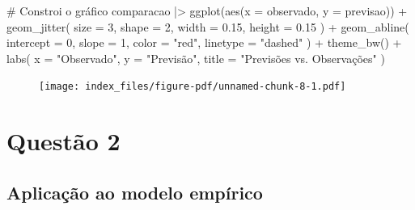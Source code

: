 \documentclass[
  letterpaper,
  DIV=11,
  numbers=noendperiod]{scrreprt}
\newenvironment{Shaded}{\begin{snugshade}}{\end{snugshade}}
\newcommand{\AttributeTok}[1]{\textcolor[rgb]{0.40,0.45,0.13}{#1}}
\newcommand{\CommentTok}[1]{\textcolor[rgb]{0.37,0.37,0.37}{#1}}
\newcommand{\DecValTok}[1]{\textcolor[rgb]{0.68,0.00,0.00}{#1}}
\newcommand{\FloatTok}[1]{\textcolor[rgb]{0.68,0.00,0.00}{#1}}
\newcommand{\FunctionTok}[1]{\textcolor[rgb]{0.28,0.35,0.67}{#1}}
\newcommand{\NormalTok}[1]{\textcolor[rgb]{0.00,0.23,0.31}{#1}}
\newcommand{\SpecialCharTok}[1]{\textcolor[rgb]{0.37,0.37,0.37}{#1}}
\newcommand{\StringTok}[1]{\textcolor[rgb]{0.13,0.47,0.30}{#1}}
\begin{document}
\begin{Shaded}
\begin{Highlighting}[]
\CommentTok{\# Constroi o gráfico}
\NormalTok{comparacao }\SpecialCharTok{|\textgreater{}}
    \FunctionTok{ggplot}\NormalTok{(}\FunctionTok{aes}\NormalTok{(}\AttributeTok{x =}\NormalTok{ observado, }\AttributeTok{y =}\NormalTok{ previsao)) }\SpecialCharTok{+}
    \FunctionTok{geom\_jitter}\NormalTok{(}
        \AttributeTok{size =} \DecValTok{3}\NormalTok{, }\AttributeTok{shape =} \DecValTok{2}\NormalTok{,}
        \AttributeTok{width =} \FloatTok{0.15}\NormalTok{, }\AttributeTok{height =} \FloatTok{0.15}
\NormalTok{    ) }\SpecialCharTok{+}
    \FunctionTok{geom\_abline}\NormalTok{(}
        \AttributeTok{intercept =} \DecValTok{0}\NormalTok{,}
        \AttributeTok{slope =} \DecValTok{1}\NormalTok{,}
        \AttributeTok{color =} \StringTok{"red"}\NormalTok{,}
        \AttributeTok{linetype =} \StringTok{"dashed"}
\NormalTok{    ) }\SpecialCharTok{+}
    \FunctionTok{theme\_bw}\NormalTok{() }\SpecialCharTok{+}
    \FunctionTok{labs}\NormalTok{(}
        \AttributeTok{x =} \StringTok{"Observado"}\NormalTok{,}
        \AttributeTok{y =} \StringTok{"Previsão"}\NormalTok{,}
        \AttributeTok{title =} \StringTok{"Previsões vs. Observações"}
\NormalTok{    )}
\end{Highlighting}
\end{Shaded}

\begin{figure}[H]

{\centering \texttt{[image: index\_files/figure-pdf/unnamed-chunk-8-1.pdf]}

}

\end{figure}


\hypertarget{questuxe3o-2}{%
\chapter*{Questão 2}\label{questuxe3o-2}}


\hypertarget{aplicauxe7uxe3o-ao-modelo-empuxedrico-1}{%
\section*{Aplicação ao modelo
empírico}\label{aplicauxe7uxe3o-ao-modelo-empuxedrico-1}}
\end{document}
